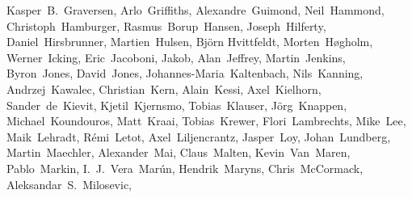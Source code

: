 \begin{FlushLeft}
  Kasper~B.~Graversen,    %
  Arlo~Griffiths,         %
  Alexandre~Guimond,      %
  Neil~Hammond,           %
  Christoph~Hamburger,    %
  Rasmus~Borup~Hansen,    %
  Joseph~Hilferty,        %
  Daniel~Hirsbrunner,     %
  Martien~Hulsen,         %
  Bj\"orn Hvittfeldt,     %
  Morten~H\o gholm,       %
  Werner~Icking,          %
  Eric~Jacoboni,          %
  Jakob,                  %
  Alan~Jeffrey,           %
  Martin~Jenkins,         %
  Byron~Jones,            %
  David~Jones,            %
  Johannes-Maria~Kaltenbach, %
  Nils~Kanning,           %
  Andrzej~Kawalec,        %
  Christian~Kern,         %
  Alain~Kessi,            %
  Axel~Kielhorn,          %
  Sander~de~Kievit,       %
  Kjetil~Kjernsmo,        %
  Tobias~Klauser,		%
  J\"org~Knappen,         %
  Michael~Koundouros,     %
  Matt~Kraai,             %
  Tobias~Krewer,          %
  Flori~Lambrechts,       %
  Mike~Lee,               %
  Maik~Lehradt,           %
  R\'emi~Letot,           %
  Axel~Liljencrantz,	%
  Jasper~Loy,             %
  Johan~Lundberg,         %
  Martin~Maechler,        %
  Alexander~Mai,          %
  Claus~Malten,           %
  Kevin~Van~Maren,        %
  Pablo~Markin,
  I.~J.~Vera~Mar\'un,     %
  Hendrik~Maryns,         %
  Chris~McCormack,        %
  Aleksandar~S.~Milosevic, %

\end{FlushLeft}
